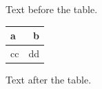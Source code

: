 \documentclass[12pt]{article}
\begin{document}
Text before the table.

\begin{tabular}{|l|r|}\hline a & b\\\hline cc & dd\\\hline\end{tabular}

Text after the table.
\end{document}
